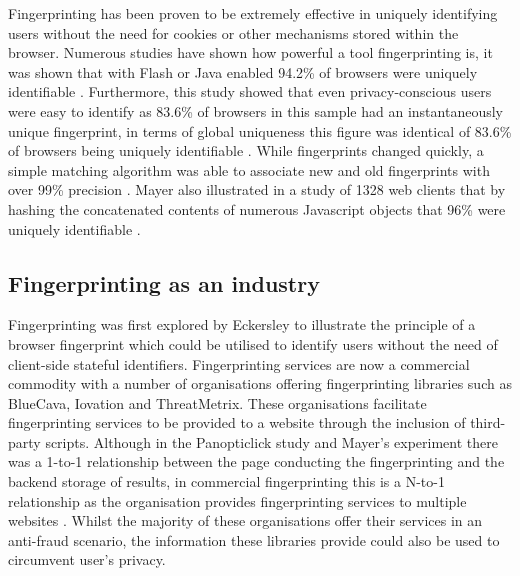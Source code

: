 \documentclass[12pt]{article}
\begin{document}
Fingerprinting has been proven to be extremely effective in uniquely identifying users without the need for cookies or other mechanisms stored within the browser. Numerous studies have shown how powerful a tool fingerprinting is, it was shown that with Flash or Java enabled 94.2\% of browsers were uniquely identifiable \parencite{uniqueBrowser}. Furthermore, this study showed that even privacy-conscious users were easy to identify as 83.6\% of browsers in this sample had an instantaneously unique fingerprint, in terms of global uniqueness this figure was identical of 83.6\% of browsers being uniquely identifiable \parencite{uniqueBrowser}. While fingerprints changed quickly, a simple matching algorithm was able to associate new and old fingerprints with over 99\% precision \parencite{uniqueBrowser}. Mayer also illustrated in a study of 1328 web clients that by hashing the concatenated contents of numerous Javascript objects that 96\% were uniquely identifiable \parencite{mayer09}.

\subsection{Fingerprinting as an industry}
Fingerprinting was first explored by Eckersley \parencite{uniqueBrowser} to illustrate the principle of a browser fingerprint which could be utilised to identify users without the need of client-side stateful identifiers. Fingerprinting services are now a commercial commodity with a number of organisations offering fingerprinting libraries such as BlueCava, Iovation and ThreatMetrix. These organisations facilitate fingerprinting services to be provided to a website through the inclusion of third-party scripts. Although in the Panopticlick study \parencite{uniqueBrowser} and Mayer's experiment \parencite{mayer09} there was a 1-to-1 relationship between the page conducting the fingerprinting and the backend storage of results, in commercial fingerprinting this is a N-to-1 relationship as the organisation provides fingerprinting services to multiple websites \parencite{cookielessMonster}. Whilst the majority of these organisations offer their services in an anti-fraud scenario, the information these libraries provide could also be used to circumvent user's privacy.

\end{document}
